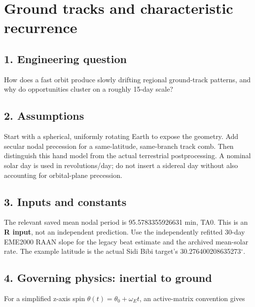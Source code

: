 \documentclass[10pt,a4paper]{article}
\numberwithin{equation}{section}
\begin{document}
\clearpage\section{Ground tracks and characteristic recurrence}\label{ch:5}

\subsection*{1. Engineering question}
\begin{sloppypar}How does a fast orbit produce slowly drifting regional ground-track patterns, and why do opportunities cluster on a roughly 15-day scale?\end{sloppypar}


\subsection*{2. Assumptions}
\begin{sloppypar}Start with a spherical, uniformly rotating Earth to expose the geometry. Add secular nodal precession for a same-latitude, same-branch track comb. Then distinguish this hand model from the actual terrestrial postprocessing. A nominal solar day is used in revolutions/day; do not insert a sidereal day without also accounting for orbital-plane precession.\end{sloppypar}


\subsection*{3. Inputs and constants}
\begin{sloppypar}The relevant saved mean nodal period is 95.5783355926631 min, \cite{S07} TA0. This is an \textbf{R input}, not an independent prediction. Use the independently refitted 30-day EME2000 RAAN slope for the legacy beat estimate and the archived mean-solar rate. The example latitude is the actual Sidi Bibi target's 30.276400208635273\ensuremath{{}^{\circ}}.\end{sloppypar}


\subsection*{4. Governing physics: inertial to ground}

\begin{sloppypar}For a simplified z-axis spin \(\theta(t)=\theta_0+\omega_Et\), an active-matrix convention gives\end{sloppypar}
\end{document}
